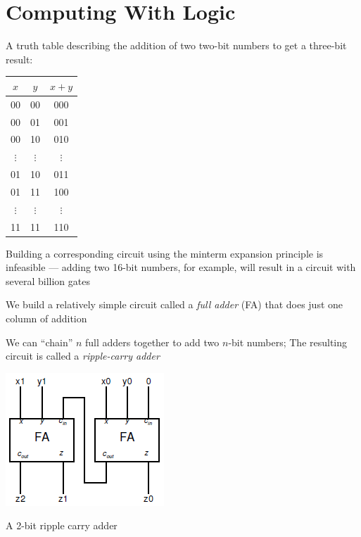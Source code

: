 \documentclass[8pt,a4paper,compress]{beamer}
\begin{document}
\section{Computing With Logic}
\begin{frame}[fragile]
A truth table describing the addition of two two-bit numbers to get a three-bit result:
\begin{center}
\begin{tabular}{cc|c}
$x$ & $y$ & $x +y$ \\ \hline
00 & 00 & 000 \\
00 & 01 & 001 \\
00 & 10 & 010 \\
$\vdots$ & $\vdots$ & $\vdots$ \\
01 & 10 & 011 \\
01 & 11 & 100 \\
$\vdots$ & $\vdots$ & $\vdots$ \\
11 & 11 & 110
\end{tabular}
\end{center}

\bigskip

Building a corresponding circuit using the minterm expansion principle is infeasible --- adding two 16-bit numbers, for example, will result in a circuit with several billion gates
\end{frame}

\begin{frame}[fragile]
We build a relatively simple circuit called a \emph{full adder} (FA) that does just one column of addition

\bigskip

We can ``chain'' $n$ full adders together to add two $n$-bit numbers;  The resulting circuit is called a \emph{ripple-carry adder}

\bigskip

\begin{center}
\includegraphics[scale=0.4]{figures/ripple_carry_adder.png}

\smallskip

\tiny A 2-bit ripple carry adder
\end{center}
\end{frame}
\end{document}
